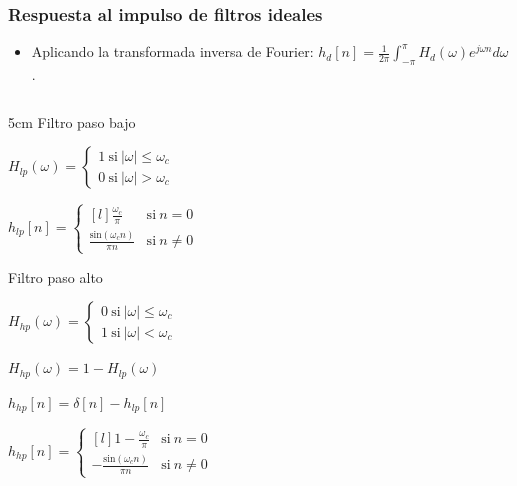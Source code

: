 \documentclass[handout]{beamer}
\numberwithin{section}{part}
\begin{document}
\begin{frame}
  \frametitle{Respuesta al impulso de filtros ideales}
  \footnotesize 
  \begin{itemize}
    \item Aplicando la transformada inversa de Fourier: \color{blue}$h_d[n]\!=\frac{1}{2\pi}\int_{-\pi}^\pi H_d(\omega) e^{j\omega n} d\omega$\color{black}.
  \end{itemize}
  
  \begin{columns}[T]
    \begin{column}{5cm}
    \scriptsize\centering
    \alert{Filtro paso bajo}

    \vspace{0.2cm}
    $H_{lp}(\omega)=\begin{cases}1~\mathrm{si}~|\omega|\leq\omega_c\\0~\mathrm{si}~|\omega|>\omega_c\end{cases}$

    \vspace{0.2cm}
    $h_{lp}[n]=\left\{\begin{matrix*}[l]
      \frac{\omega_c}{\pi} & \mathrm{si}~n=0\\\frac{\mathrm{sin}(\omega_c n)}{\pi n} & \mathrm{si}~n\neq 0
    \end{matrix*}\right.$

    \vspace{0.5cm}
    \alert{Filtro paso alto}

    \vspace{0.1cm}
    $H_{hp}(\omega)=\begin{cases}0~\mathrm{si}~|\omega|\leq\omega_c\\1~\mathrm{si}~|\omega|<\omega_c\end{cases}$

    \vspace{0.1cm}
    \color{gray}
    $H_{hp}(\omega)=1 - H_{lp}(\omega)$

    \vspace{0.1cm}
    $h_{hp}[n]=\delta[n] - h_{lp}[n]$
    \color{black}

    \vspace{0.1cm}
    $h_{hp}[n]=\left\{\begin{matrix*}[l]
      1-\frac{\omega_c}{\pi} & \mathrm{si}~n=0\\
      -\frac{\mathrm{sin}(\omega_c n)}{\pi n} & \mathrm{si}~n\neq 0
    \end{matrix*}\right.$
    

\end{column}
\end{columns}
\end{frame}
\end{document}
